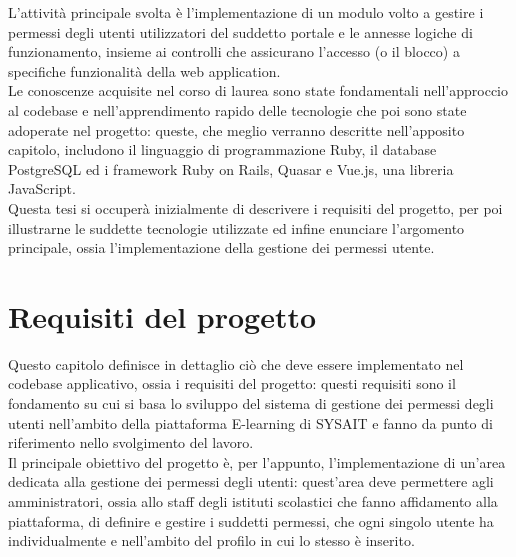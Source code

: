 \documentclass[a4paper, 12pt]{book}
\begin{document}
L'attività principale svolta è l'implementazione di un modulo volto a gestire i permessi degli utenti utilizzatori del suddetto portale e le
annesse logiche di funzionamento, insieme ai controlli che assicurano l'accesso (o il blocco) a specifiche funzionalità della web application.\\

Le conoscenze acquisite nel corso di laurea sono state fondamentali nell'approccio al codebase e nell'apprendimento rapido delle tecnologie
che poi sono state adoperate nel progetto: queste, che meglio verranno descritte nell'apposito capitolo, includono il linguaggio di programmazione Ruby,
il database PostgreSQL ed i framework Ruby on Rails, Quasar e Vue.js, una libreria JavaScript.\\

Questa tesi si occuperà inizialmente di descrivere i requisiti del progetto, per poi illustrarne le suddette tecnologie utilizzate ed infine
enunciare l'argomento principale, ossia l'implementazione della gestione dei permessi utente.



\chapter{Requisiti del progetto}

\thispagestyle{empty}


Questo capitolo definisce in dettaglio ciò che deve essere implementato nel codebase applicativo, ossia i requisiti del progetto: questi requisiti sono il fondamento su cui
si basa lo sviluppo del sistema di gestione dei permessi degli utenti nell'ambito della piattaforma E-learning di SYSAIT e fanno da punto di riferimento
nello svolgimento del lavoro.\\

Il principale obiettivo del progetto è, per l'appunto, l'implementazione di un'area dedicata alla gestione dei permessi degli utenti: quest'area deve permettere
agli amministratori, ossia allo staff degli istituti scolastici che fanno affidamento alla piattaforma, di definire e gestire i suddetti permessi,
che ogni singolo utente ha individualmente e nell'ambito del profilo in cui lo stesso è inserito.\\
\end{document}
